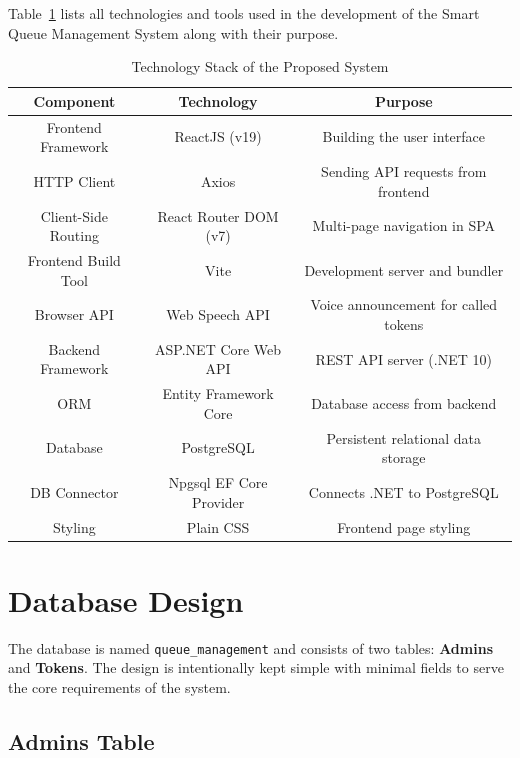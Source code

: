 Table~\ref{tab:techstack} lists all technologies and tools used in the development of the Smart Queue Management System along with their purpose.

\begin{table}[htbp]
    \centering
    \begin{tabular}{|c|c|c|}
        \hline
        \textbf{Component} & \textbf{Technology} & \textbf{Purpose} \\
        \hline
        Frontend Framework & ReactJS (v19) & Building the user interface \\
        \hline
        HTTP Client & Axios & Sending API requests from frontend \\
        \hline
        Client-Side Routing & React Router DOM (v7) & Multi-page navigation in SPA \\
        \hline
        Frontend Build Tool & Vite & Development server and bundler \\
        \hline
        Browser API & Web Speech API & Voice announcement for called tokens \\
        \hline
        Backend Framework & ASP.NET Core Web API & REST API server (.NET 10) \\
        \hline
        ORM & Entity Framework Core & Database access from backend \\
        \hline
        Database & PostgreSQL & Persistent relational data storage \\
        \hline
        DB Connector & Npgsql EF Core Provider & Connects .NET to PostgreSQL \\
        \hline
        Styling & Plain CSS & Frontend page styling \\
        \hline
    \end{tabular}
    \caption{Technology Stack of the Proposed System}
    \label{tab:techstack}
\end{table}

\section{Database Design}

The database is named \texttt{queue\_management} and consists of two tables: \textbf{Admins} and \textbf{Tokens}. The design is intentionally kept simple with minimal fields to serve the core requirements of the system.

\subsection{Admins Table}

